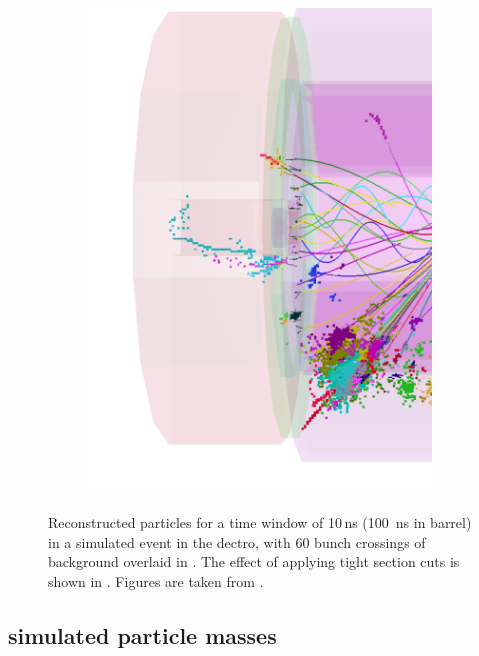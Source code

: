 \begin{figure}[tbph]
\begin{subfigure}[b]{0.45\textwidth}
    \includegraphics[width=\textwidth]{pandora/evtDisplayggHad2}
    \caption{}
    \label{fig:pandoraEvtDisplayggHad2}
  \end{subfigure}
\caption[Effect of the suppression of the background with the tight \PFO selection.]
{Reconstructed particles for a time window of 10\,ns (100 \,ns in \HCAL barrel) in a simulated \HepProcess{\Pep\Pem \to \PHiggs\PHiggs \to \Ptop\APbottom\Pbottom\APtop} event in the \CLICILD dectro, with 60 bunch crossings of \ggHad background overlaid in . The effect of applying tight \PFO section cuts is shown in .  Figures are taken from \cite{Marshall:2012ry}.}
\label{fig:pandoraEvtDisplayggHad}
\end{figure}

\subsection{\CLIC simulated particle masses}
\label{sec:pandoraCLICsimMass}

